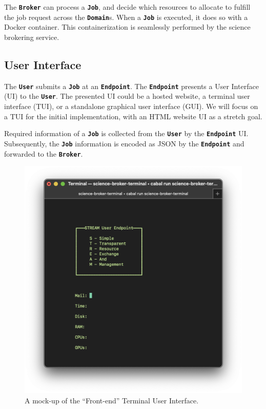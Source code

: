 \documentclass{ReportCUNY}
\newcommand{\KeyWord}[1]{\textbf{\texttt{#1}}}
\begin{document}
The \KeyWord{Broker} can process a \KeyWord{Job}, and decide which resources to allocate to fulfill the job request across the \KeyWord{Domain}s.
When a \KeyWord{Job} is executed, it does so with a Docker container.
This containerization is seamlessly performed by the science brokering service.


\subsection{User Interface}

The \KeyWord{User} submits a \KeyWord{Job} at an \KeyWord{Endpoint}.
The \KeyWord{Endpoint} presents a User Interface (UI) to the \KeyWord{User}.
The presented UI could be a hosted website, a terminal user interface (TUI), or a standalone graphical user interface (GUI).
We will focus on a TUI for the initial implementation, with an HTML website UI as a stretch goal.

Required information of a \KeyWord{Job} is collected from the \KeyWord{User} by the \KeyWord{Endpoint} UI.
Subsequently, the \KeyWord{Job} information is encoded as JSON by the \KeyWord{Endpoint} and forwarded to the \KeyWord{Broker}.

\begin{figure}
\includegraphics[width=\textwidth]{Frontend-Mockup.png}
\caption{A mock-up of the ``Front-end'' Terminal User Interface.}
\end{figure}
\end{document}
